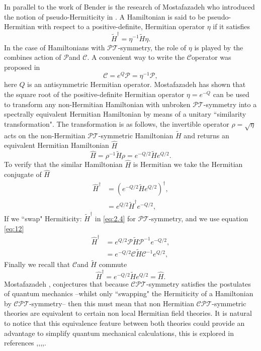 \documentclass[12pt, a4paper]{report}
\newcommand\PT{\(\mathcal{PT}\)}
\newcommand\PP{\(\mathcal{P}\)}
\newcommand\CPT{\(\mathcal{CPT}\)}
\newcommand\CC{\(\mathcal{C}\)}
\begin{document}
In parallel to the work of Bender is the research of Mostafazadeh who introduced the notion of pseudo-Hermiticity in \cite{Mostafazadeh}. A Hamiltonian is said to be pseudo-Hermitian with respect to a positive-definite, Hermitian operator $\eta$ if it satisfies
\begin{equation}\label{eq:2.1}
\tilde{H}^{\dagger}  = \eta^{-1}\tilde{H}\eta.
\end{equation}
In the case of Hamiltonians with \PT-symmetry, the role of $\eta$ is played by the combines action of \PP\:and \CC. A convenient way to write the \CC\:operator was proposed in \cite{Bender_2006} 
\begin{equation}\label{eq:2.2}
\mathcal{C} = e^{Q}\mathcal{P} = \eta^{-1}\mathcal{P} ,
\end{equation}
here $Q$ is an antisymmetric Hermitian operator. Mostafazadeh \cite{Mostafazadeh2} has shown that the square root of the positive-definite Hermitian operator $\eta = e^{-Q}$ can be used to transform any non-Hermitian Hamiltonian with unbroken \PT-symmetry into a spectrally equivalent Hermitian Hamiltonian by means of a unitary ``similarity transformation"\cite{PTvsDH}\cite{Jones_2005}. The transformation is as follows, the invertible operator $\rho = \sqrt{\eta}$ acts on the non-Hermitian \PT-symmetric Hamiltonian $\tilde{H}$ and returns an equivalent Hermitian Hamiltonian $\hat{H}$
\begin{equation}\label{eq:2.3}
\hat{H} = \rho^{-1}\tilde{H}\rho = e^{-Q/2}\tilde{H}e^{Q/2}.
\end{equation}
To verify that the similar Hamiltonian $\hat{H}$ is Hermitian we take the Hermitian conjugate of $\hat{H}$
\begin{align}\label{eq:2.4}
\hat{H}^{\dagger} &= (e^{-Q/2}\tilde{H}e^{Q/2})^{\dagger}\nonumber,\\
& = e^{Q/2}\tilde{H}^{\dagger}e^{-Q/2},
\end{align}
If we ``swap" Hermiticity: $\tilde{H}^{\dagger}$ in \ref{eq:2.4} for \PT-symmetry, and we use equation \ref{eq:12}
\begin{align}\label{eq:2.5}
\hat{H}^{\dagger} &= e^{Q/2}\mathcal{P}\tilde{H}\mathcal{P}^{-1}e^{-Q/2}\nonumber,\\
&= e^{-Q/2}\mathcal{C}\tilde{H}\mathcal{C}^{-1}e^{Q/2},
\end{align}
Finally we recall that \CC\:and $\tilde{H}$ commute
\begin{equation}\label{eq:2.6}
\hat{H}^{\dagger} = e^{-Q/2}\tilde{H}e^{Q/2} = \hat{H}.
\end{equation}
Mostafazadeh \cite{Mostafazadeh}, conjectures that because \CPT-symmetry satisfies the postulates of quantum mechanics --whilst only ``swapping" the Hermiticity of a Hamiltonian by \CPT-symmetry-- then this must mean that non Hermitian \CPT-symmetric theories are equivalent to certain non local Hermitian field theories. It is natural to notice that this equivalence feature between both theories could provide an advantage to simplify quantum mechanical calculations, this is explored in references \cite{Mostafazadeh},\cite{EquivalentHH},\cite{Pseudo-HermiticityIII},\cite{Jones_2005},\cite{taleof2potentials}.
\end{document}
